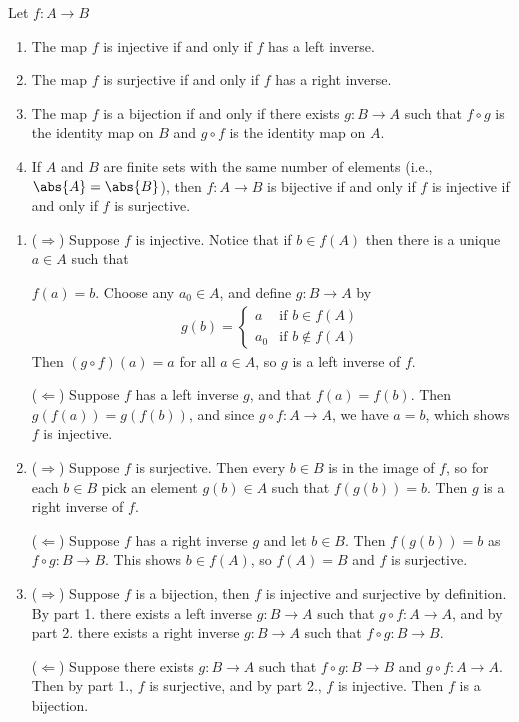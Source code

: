 {Let $f:A\to B$
\begin{enumerate}[leftmargin=20pt, itemsep=0pt, topsep=3pt]
    \item The map $f$ is injective if and only if $f$ has a left inverse.
    \item The map $f$ is surjective if and only if $f$ has a right inverse.
    \item The map $f$ is a bijection if and only if there exists $g:B\to A$ such 
    that $f \circ g$ is the identity map on $B$ and $g \circ f$ is the identity map on $A$.
    \item If $A$ and $B$ are finite sets with the same number of elements (i.e., $\abs{A} = \abs{B}$),
    then $f : A \to B$ is bijective if and only if $f$ is injective if and only if $f$ is surjective.
\end{enumerate}}
{\begin{enumerate}[leftmargin=20pt, itemsep=0pt, topsep=3pt]
    \item ($\Rightarrow$) Suppose $f$ is injective. Notice that if $b\in f(A)$ then there is a unique $a\in A$ such that
    
    $f(a)=b$. Choose any $a_{0}\in A$, and define $g:B\to A$ by
    \linespread{1}\selectfont
    \begin{align*}
        g(b) = \begin{cases}
            a & \text{if } b\in f(A) \\
            a_{0} & \text{if } b\notin f(A)
        \end{cases}
    \end{align*}
    \linespread{1.2}\selectfont
    Then $(g\circ f)(a) = a$ for all $a\in A$, so $g$ is a left inverse of $f$.
    
    ($\Leftarrow$) Suppose $f$ has a left inverse $g$, and that $f(a) = f(b)$.
    Then $g(f(a)) = g(f(b))$, and since $g\circ f:A\to A$, we have $a=b$, which shows $f$ is injective.
    \item ($\Rightarrow$) Suppose $f$ is surjective. Then every $b\in B$ is in the image of $f$, so for each $b\in B$
    pick an element $g(b)\in A$ such that $f(g(b))=b$. Then $g$ is a right inverse of $f$.

    ($\Leftarrow$) Suppose $f$ has a right inverse $g$ and let $b\in B$. Then $f(g(b))=b$ as $f\circ g: B\to B$.
    This shows $b\in f(A)$, so $f(A) = B$ and $f$ is surjective.
    \item ($\Rightarrow$) Suppose $f$ is a bijection, then $f$ is injective and surjective by definition.
    By part 1. there exists a left inverse $g:B\to A$ such that $g\circ f:A\to A$,
    and by part 2. there exists a right inverse $g:B\to A$ such that $f\circ g:B\to B$.
    
    ($\Leftarrow$) Suppose there exists $g:B\to A$ such that $f\circ g:B\to B$ and $g\circ f:A\to A$.
    Then by part 1., $f$ is surjective, and by part 2., $f$ is injective.
    Then $f$ is a bijection.
\end{enumerate}
}
